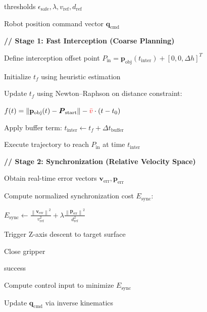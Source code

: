 \begin{algorithm}[t]
\caption{Two-Stage Dynamic Grasping Planning Strategy}
\label{algo:two_stage_dynamic_grasping}
\begin{algorithmic}[1]

\Require {}
\Require thresholds $\epsilon_{\text{safe}},\lambda,v_{\text{ref}},d_{\text{ref}}$

\Ensure Robot position command vector $\mathbf{q}_{\text{cmd}}$

\State \textbf{// Stage 1: Fast Interception (Coarse Planning)}

\State Define interception offset point
$P_{\text{in}}=\mathbf{p}_{\text{obj}}(t_{\text{inter}})+[0,0,\Delta h]^{T}$

\State Initialize $t_f$ using heuristic estimation

\Repeat

    \State Update $t_f$ using Newton--Raphson on distance constraint:

    \State
    $f(t)=
    \left\|
    \mathbf{p}_{\text{obj}}(t)-\boldsymbol{P}_{\text{start}}
    \right\|
    -
    {\color{red}\bar v}\cdot (t-t_0)$
    \Statex


\State Apply buffer term:
$t_{\text{inter}}\gets t_f+\Delta t_{\text{buffer}}$

\State Execute trajectory to reach $P_{\text{in}}$ at time $t_{\text{inter}}$

\State \textbf{// Stage 2: Synchronization (Relative Velocity Space)}


        \State {}
    \EndIf

    \State Obtain real-time error vectors
    $\mathbf{v}_{\text{err}},\mathbf{p}_{\text{err}}$

    \State Compute normalized synchronization cost $E_{\text{sync}}$:

    \State
    $E_{\text{sync}}
    \gets
    \frac{\left\|\mathbf{v}_{\text{err}}\right\|^2}{v_{\text{ref}}^{2}}
    +
    \lambda
    \frac{\left\|\mathbf{p}_{\text{err}}\right\|^2}{d_{\text{ref}}^{2}}$


        \State Trigger Z-axis descent to target surface

        \State Close gripper

        \State \Return success

    \Else

        \State Compute control input to minimize $E_{\text{sync}}$

        \State Update $\mathbf{q}_{\text{cmd}}$ via inverse kinematics

    \EndIf

\EndWhile

\end{algorithmic}
\end{algorithm}

